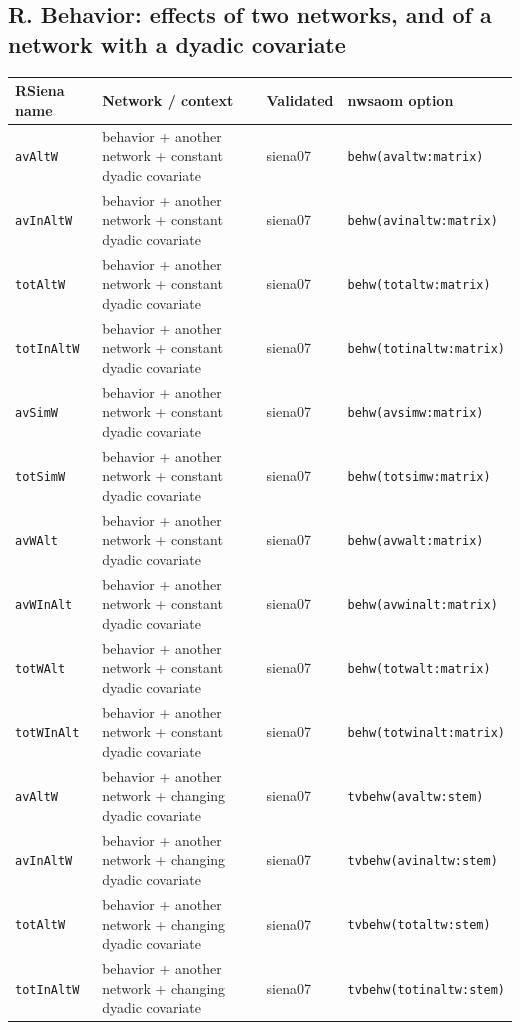 \subsection*{R. Behavior: effects of two networks, and of a network with a dyadic covariate}
\footnotesize
\begin{longtable}{@{}p{2.6cm}p{3.2cm}p{2.9cm}p{5.4cm}@{}}
\toprule
RSiena name & Network / context & Validated & nwsaom option\\
\midrule
\endhead
\texttt{avAltW} & behavior + another network + constant dyadic covariate & siena07 & \texttt{behw(avaltw:matrix)}\\
\texttt{avInAltW} & behavior + another network + constant dyadic covariate & siena07 & \texttt{behw(avinaltw:matrix)}\\
\texttt{totAltW} & behavior + another network + constant dyadic covariate & siena07 & \texttt{behw(totaltw:matrix)}\\
\texttt{totInAltW} & behavior + another network + constant dyadic covariate & siena07 & \texttt{behw(totinaltw:matrix)}\\
\texttt{avSimW} & behavior + another network + constant dyadic covariate & siena07 & \texttt{behw(avsimw:matrix)}\\
\texttt{totSimW} & behavior + another network + constant dyadic covariate & siena07 & \texttt{behw(totsimw:matrix)}\\
\texttt{avWAlt} & behavior + another network + constant dyadic covariate & siena07 & \texttt{behw(avwalt:matrix)}\\
\texttt{avWInAlt} & behavior + another network + constant dyadic covariate & siena07 & \texttt{behw(avwinalt:matrix)}\\
\texttt{totWAlt} & behavior + another network + constant dyadic covariate & siena07 & \texttt{behw(totwalt:matrix)}\\
\texttt{totWInAlt} & behavior + another network + constant dyadic covariate & siena07 & \texttt{behw(totwinalt:matrix)}\\
\texttt{avAltW} & behavior + another network + changing dyadic covariate & siena07 & \texttt{tvbehw(avaltw:stem)}\\
\texttt{avInAltW} & behavior + another network + changing dyadic covariate & siena07 & \texttt{tvbehw(avinaltw:stem)}\\
\texttt{totAltW} & behavior + another network + changing dyadic covariate & siena07 & \texttt{tvbehw(totaltw:stem)}\\
\texttt{totInAltW} & behavior + another network + changing dyadic covariate & siena07 & \texttt{tvbehw(totinaltw:stem)}\\

\end{longtable}
